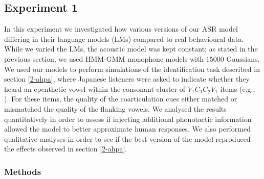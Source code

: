 \subsection{Experiment 1}%
In this experiment we investigated how various versions of our ASR model differing in their language models (LMs) compared to real behavioural data. While we varied the LMs, the acoustic model was kept constant; as stated in the previous section, we used HMM-GMM monophone models with $15000$ Gaussians. We used our models to perform simulations of the identification task described in section \ref{2-ahpa}, where Japanese listeners were asked to indicate whether they heard an epenthetic vowel within the consonant cluster of $V_{1}C_{1}C_{2}V_{1}$ items (e.g., ). For these items, the quality of the coarticulation cues either matched or mismatched the quality of the flanking vowels. We analysed the results quantitatively in order to assess if injecting additional phonotactic information allowed the model to better approximate human responses. We also performed qualitative analyses in order to see if the best version of the model reproduced the effects observed in section \ref{2-ahpa}. 

\subsubsection{Methods}

